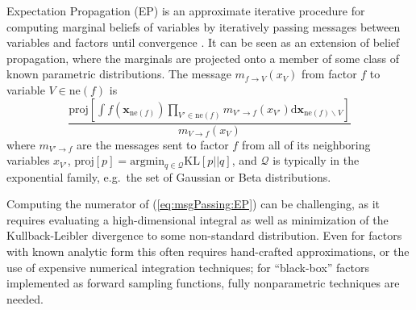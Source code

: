 \documentclass[english]{article}
\theoremstyle{plain}
\theoremstyle{plain}
\newcommand{\bx}{\mathbf{x}}				%
\newcommand{\factor}{f}				%
\newcommand{\outV}{V}                         %
\newcommand{\fis}[1]{\mathrm{ne}(#1)}   	%
\newcommand{\fx}[1]{ \mathbf{x}_{\mathrm{ne}(#1)} }   	%
\newcommand{\xin}{\mathbf{x}_{ \mathrm{in} }} 			%
\newcommand{\xout}{\mathbf{x}_{ \mathrm{out} }}			%
\newcommand{\msg}[2]{m_{#1 \rightarrow #2}}			%
\newcommand{\diffd}{\mathrm{d}}
\newcommand{\projP}[1]{\mathrm{proj} \left [ #1 \right]}
\newcommand{\argmin}[1]{\mathrm{arg}\mathrm{min}_{#1}}
\newcommand{\kld}[2]{\mathrm{KL} \left [ #1 || #2 \right ]}
\begin{document}
Expectation Propagation (EP) is an approximate iterative procedure for computing marginal beliefs of variables
by iteratively passing messages between variables and factors until convergence \citep{Minka2001}.
It can be seen as an extension of belief propagation, where the marginals are projected
onto a member of some class of known parametric distributions. 
The message $\msg{ \factor }{\outV}(x_{\outV})$  from factor $\factor$ to variable $\outV\in\fis{\factor}$ is 
%
\begin{equation}
\frac{ \projP{ 
\int \factor (\fx{\factor}) \prod_{\outV' \in \fis{\factor}} \msg{\outV'}{\factor}(x_{\outV'}) \diffd 
\bx_{\fis{\factor} \backslash \outV}} }
{\msg{\outV}{\factor}(x_{\outV})}
%
\label{eq:msgPassing:EP}
\end{equation}
%
where $\msg{\outV'}{\factor}$ are the messages sent to factor $\factor$ from all of its neighboring variables $x_{\outV'}$,
$\projP{p} = \argmin{q \in \mathcal{Q}} \kld{p}{q}$, and $\mathcal{Q}$ is typically in the exponential family, e.g.\ the set of Gaussian or Beta distributions.



Computing the numerator of (\ref{eq:msgPassing:EP}) can be challenging, as it requires evaluating a high-dimensional integral as well as minimization of the Kullback-Leibler divergence to some non-standard distribution. Even for factors with known analytic form this often requires hand-crafted approximations, or the use of expensive numerical integration techniques; for ``black-box'' factors implemented as forward sampling functions, fully nonparametric techniques are needed. 

\end{document}
